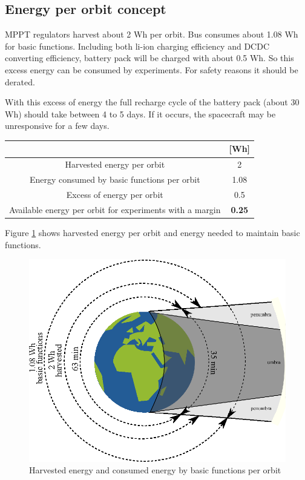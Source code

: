 \subsection{Energy per orbit concept}
MPPT regulators harvest about 2 Wh per orbit. Bus consumes about 1.08 Wh for basic functions. Including both li-ion charging efficiency and DCDC converting efficiency, battery pack will be charged with about 0.5 Wh. So this excess energy can be consumed by experiments. For safety reasons it should be derated.

With this excess of energy the full recharge cycle of the battery pack (about 30 Wh) should take between 4 to 5 days. If it occurs, the spacecraft may be unresponsive for a few days.

\begin{center}
	\begin{tabular}{c|c}
		&[Wh] \\ \hline
		Harvested energy per orbit & 2 \\ \hline
		Energy consumed by basic functions per orbit & 1.08 \\ \hline
		Excess of energy per orbit & 0.5 \\ \hline
		Available energy per orbit for experiments with a margin & \textbf{0.25}
	\end{tabular}
\end{center}

Figure \ref{fig:pwr:energy} shows harvested energy per orbit and energy needed to maintain basic functions.

\begin{figure}[ht]
	\begin{center}
		\includegraphics{img/power-budget-energy}
		\caption{Harvested energy and consumed energy by basic functions per orbit}
		\label{fig:pwr:energy}
	\end{center}
\end{figure}


